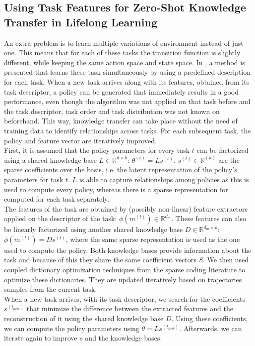 \documentclass[a4paper]{article}
\begin{document}
\subsection{Using Task Features for Zero-Shot Knowledge Transfer in Lifelong Learning}
An extra problem is to learn multiple variations of environment instead of just one. This means that for each of these tasks the transition function is slightly different, while keeping the same action space and state space.
In \cite{Isele2016UsingLearning}, a method is presented that learns these task simultaneously by using a predefined description for each task. When a new task arrives along with its features, obtained from its task descriptor, a policy can be generated that immediately results in a good performance, even though the algorithm was not applied on that task before and the task descriptor, task order and task distribution was not known on beforehand. This way, knowledge transfer can take place without the need of training data to identify relationships across tasks. For each subsequent task, the policy and feature vector are iteratively improved.\\
First, it is assumed that the policy parameters for every task $t$ can be factorized using a shared knowledge base $L \in \mathbb{R}^{d \times k}$: $\theta^{(t)} = Ls^{(t)}$. $s^{(t)} \in \mathbb{R}^{(k)}$ are the sparse coefficients over the basis, i.e. the latent representation of the policy's parameters for task $t$. $L$ is able to capture relationships among policies as this is used to compute every policy, whereas there is a sparse representation for computed for each task separately.\\
The features of the task are obtained by (possibly non-linear) feature extractors applied on the descriptor of the task: $\phi(m^{(t)}) \in \mathbb{R}^{d_m}$. These features can also be linearly factorized using another shared knowledge base $D \in \mathbb{R}^{d_m \times k}$: $\phi(m^{(t)}) = Ds^{(t)}$, where the same sparse representation is used as the one used to compute the policy. Both knowledge bases provide information about the task and because of this they share the same coefficient vectors $S$. We then used coupled dictionary optimization techniques from the sparse coding literature to optimize these dictionaries. They are updated iteratively based on trajectories samples from the current task.\\
When a new task arrives, with its task descriptor, we search for the coefficients $s^{(t_{new})}$ that minimize the difference between the extracted features and the reconstruction of it using the shared knowledge base $D$. Using these coefficients, we can compute the policy parameters using $\theta = Ls^{(t_{new})}$. Afterwards, we can iterate again to improve $s$ and the knowledge bases.
\end{document}
